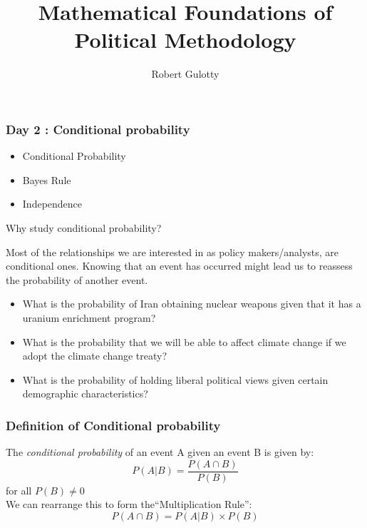 \documentclass{beamer}
\title[PLSC 43401]{Mathematical Foundations of Political Methodology}
\author{Robert Gulotty}
\institute[Chicago]{University of Chicago}
\numberwithin{equation}{section}
\begin{document}
\begin{frame}
\maketitle
\end{frame}

\begin{frame}
\frametitle{Day 2 : Conditional probability}

\begin{itemize}
\item Conditional Probability
\item Bayes Rule
\item Independence
\end{itemize}
\end{frame}

\begin{frame}{Why study conditional probability?}

Most of the relationships we are interested in as policy makers/analysts, are conditional ones. Knowing that an event has occurred might lead us to reassess the probability of another event.\pause

\begin{itemize}
\item What is the probability of Iran obtaining nuclear weapons given that it has a uranium enrichment program?\pause
\item What is the probability that we will be able to affect climate change if we adopt the climate change treaty?\pause
\item What is the probability of holding liberal political views given certain demographic characteristics?
\end{itemize}
\end{frame}

\begin{frame}
\frametitle{Definition of Conditional probability}
The \emph{conditional probability} of an event A given an event B is given by:
$$P(A|B)=\frac{P(A\cap B)}{P(B)}$$
for all $P(B)\neq 0$\\
\pause We can rearrange this to form the``Multiplication Rule'':
$$P(A\cap B)=P(A|B)\times P(B)$$

\end{frame}
\end{document}
